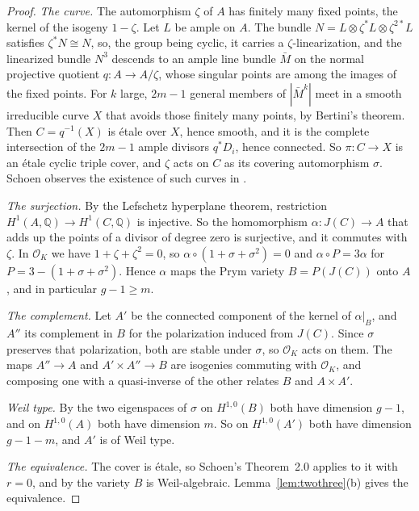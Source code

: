 \documentclass[11pt]{amsart}
\theoremstyle{definition}
\theoremstyle{remark}
\newcommand{\QQ}{\mathbb{Q}}
\newcommand{\cO}{\mathcal{O}}
\begin{document}
\begin{proof}
\emph{The curve.} The automorphism $\zeta$ of $A$ has finitely many fixed
points, the kernel of the isogeny $1-\zeta$. Let $L$ be ample on $A$. The
bundle $N=L\otimes\zeta^{*}L\otimes\zeta^{2*}L$ satisfies $\zeta^{*}N\cong N$,
so, the group being cyclic, it carries a $\zeta$-linearization, and the
linearized bundle $N^{3}$ descends to an ample line bundle $\bar M$ on the
normal projective quotient $q\colon A\to A/\zeta$, whose singular points are
among the images of the fixed points. For $k$ large, $2m-1$ general members of $|\bar M^{k}|$ meet in a
smooth irreducible curve $X$ that avoids those finitely many points, by
Bertini's theorem. Then $C=q^{-1}(X)$ is \'etale over $X$, hence smooth, and
it is the complete intersection of the $2m-1$ ample divisors $q^{*}D_{i}$,
hence connected. So $\pi\colon C\to X$ is an \'etale cyclic triple cover, and
$\zeta$ acts on $C$ as its covering automorphism $\sigma$. Schoen observes
the existence of such curves in \cite[Section~3]{Sch88}.

\emph{The surjection.} By the Lefschetz hyperplane theorem, restriction
$H^{1}(A,\QQ)\to H^{1}(C,\QQ)$ is injective. So the homomorphism
$\alpha\colon J(C)\to A$ that adds up the points of a divisor of degree zero
is surjective, and it commutes with $\zeta$. In $\cO_{K}$ we have
$1+\zeta+\zeta^{2}=0$, so $\alpha\circ(1+\sigma+\sigma^{2})=0$ and
$\alpha\circ P=3\alpha$ for $P=3-(1+\sigma+\sigma^{2})$. Hence $\alpha$ maps
the Prym variety $B=P(J(C))$ onto $A$, and in particular $g-1\ge m$.

\emph{The complement.} Let $A'$ be the connected component of the kernel of
$\alpha|_{B}$, and $A''$ its complement in $B$ for the polarization induced
from $J(C)$. Since $\sigma$ preserves that polarization, both are stable under
$\sigma$, so $\cO_{K}$ acts on them. The maps $A''\to A$ and
$A'\times A''\to B$ are isogenies commuting with $\cO_{K}$, and composing one
with a quasi-inverse of the other relates $B$ and $A\times A'$.

\emph{Weil type.} By \cite[Lemma~1.6a]{Sch88} the two eigenspaces of $\sigma$
on $H^{1,0}(B)$ both have dimension $g-1$, and on $H^{1,0}(A)$ both have
dimension $m$. So on $H^{1,0}(A')$ both have dimension $g-1-m$, and $A'$ is
of Weil type.

\emph{The equivalence.} The cover is \'etale, so Schoen's Theorem~2.0 applies
to it with $r=0$, and by \cite[Corollary~3.1]{Sch88} the variety $B$ is
Weil-algebraic. Lemma~\ref{lem:twothree}(b) gives the equivalence.
\end{proof}
\end{document}
